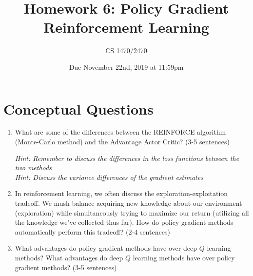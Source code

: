 \documentclass{article}
\title{Homework 6: Policy Gradient Reinforcement Learning}
\date{Due November 22nd, 2019 at 11:59pm}
\author{CS 1470/2470}
\begin{document}
\maketitle

\section{Conceptual Questions}
\begin{enumerate}

  \item What are some of the differences between the REINFORCE algorithm (Monte-Carlo method) and the Advantage Actor Critic? (3-5 sentences) 
  
    \textit{Hint: Remember to discuss the differences in the loss functions between the two methods} \\
    \textit{Hint: Discuss the variance differences of the gradient estimates}

    \item In reinforcement learning, we often discuss the exploration-exploitation tradeoff. We mush balance acquiring new knowledge about our environment (exploration) while simultaneously trying to maximize our return (utilizing all the knowledge we've collected thus far). How do policy gradient methods automatically perform this tradeoff? (2-4 sentences)
    
    \item What advantages do policy gradient methods have over deep $Q$ learning methods? What advantages do deep $Q$ learning methods have over policy gradient methods? (3-5 sentences)

\end{enumerate}
\end{document}
